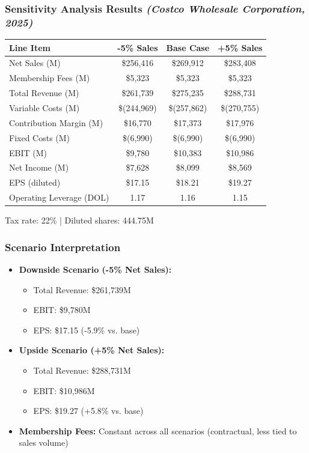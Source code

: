 \documentclass[11pt]{beamer}
\begin{document}
\begin{frame}
\frametitle{Sensitivity Analysis Results \textit{(Costco Wholesale Corporation, 2025)}}
\begin{center}
\tiny
\begin{tabular}{lccc}
\toprule
\textbf{Line Item} & \textbf{-5\% Sales} & \textbf{Base Case} & \textbf{+5\% Sales} \\
\midrule
Net Sales (M) & \$256,416 & \$269,912 & \$283,408 \\
Membership Fees (M) & \$5,323 & \$5,323 & \$5,323 \\
Total Revenue (M) & \$261,739 & \$275,235 & \$288,731 \\
Variable Costs (M) & \$(244,969) & \$(257,862) & \$(270,755) \\
Contribution Margin (M) & \$16,770 & \$17,373 & \$17,976 \\
Fixed Costs (M) & \$(6,990) & \$(6,990) & \$(6,990) \\
EBIT (M) & \$9,780 & \$10,383 & \$10,986 \\
Net Income (M) & \$7,628 & \$8,099 & \$8,569 \\
EPS (diluted) & \$17.15 & \$18.21 & \$19.27 \\
Operating Leverage (DOL) & 1.17 & 1.16 & 1.15 \\
\bottomrule
\end{tabular}
\end{center}
\vspace{0.2cm}
\scriptsize Tax rate: 22\% | Diluted shares: 444.75M
\end{frame}

\begin{frame}
\frametitle{Scenario Interpretation}
\begin{itemize}
  \item \textbf{Downside Scenario (-5\% Net Sales):}
    \begin{itemize}
      \item Total Revenue: \$261,739M
      \item EBIT: \$9,780M
      \item EPS: \$17.15 (-5.9\% vs. base)
    \end{itemize}
  \item \textbf{Upside Scenario (+5\% Net Sales):}
    \begin{itemize}
      \item Total Revenue: \$288,731M
      \item EBIT: \$10,986M
      \item EPS: \$19.27 (+5.8\% vs. base)
    \end{itemize}
  \item \textbf{Membership Fees:} Constant across all scenarios (contractual, less tied to sales volume)
\end{itemize}
\end{frame}
\end{document}
